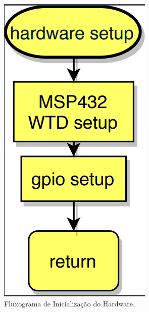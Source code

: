 \begin{apendicesenv}
\begin{figure}[!h]
	\centerfloat
	\centering
	\includegraphics[keepaspectratio=true,scale=0.4]{figuras/flowChart_hardware.PNG}
	\caption{Fluxograma de Inicialização do Hardware.}
	\label{flowChart_hardware}
\end{figure}


\end{apendicesenv}
